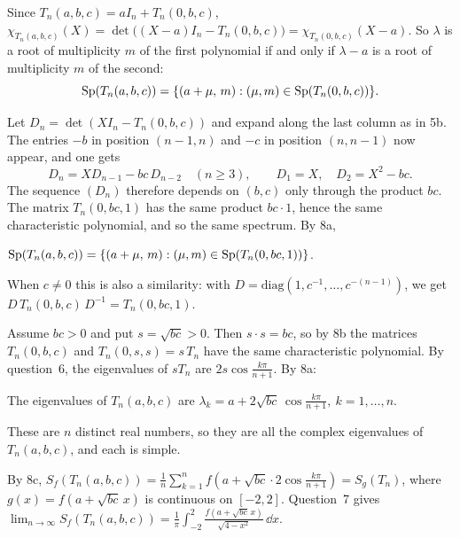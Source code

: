 \documentclass[11pt,a4paper]{article}
\begin{document}
Since $T_n(a,b,c) = aI_n + T_n(0,b,c)$,
$\chi_{T_n(a,b,c)}(X) = \det\bigl((X-a)I_n - T_n(0,b,c)\bigr) = \chi_{T_n(0,b,c)}(X-a)$.
So $\lambda$ is a root of multiplicity $m$ of the first polynomial if and only if $\lambda - a$
is a root of multiplicity $m$ of the second:
\[
  \operatorname{Sp}(T_n(a,b,c)) = \{(a+\mu,\,m) : (\mu,m)\in\operatorname{Sp}(T_n(0,b,c))\}.
\]

Let $D_n = \det(XI_n - T_n(0,b,c))$ and expand along the last column as in 5b. The
entries $-b$ in position $(n-1,n)$ and $-c$ in position $(n,n-1)$ now appear, and one gets
\[
  D_n = X D_{n-1} - bc\,D_{n-2}\quad(n\ge3), \qquad D_1 = X,\quad D_2 = X^2 - bc .
\]
The sequence $(D_n)$ therefore depends on $(b,c)$ only through the product $bc$. The matrix
$T_n(0,bc,1)$ has the same product $bc\cdot1$, hence the same characteristic polynomial, and
so the same spectrum. By 8a,
\begin{result}
$\operatorname{Sp}(T_n(a,b,c)) = \{(a+\mu,\,m) : (\mu,m)\in\operatorname{Sp}(T_n(0,bc,1))\}$.
\end{result}
\begin{remark}
When $c\ne0$ this is also a similarity: with $D = \mathrm{diag}(1, c^{-1},\dots,c^{-(n-1)})$,
we get $D\,T_n(0,b,c)\,D^{-1} = T_n(0,bc,1)$.
\end{remark}

Assume $bc > 0$ and put $s = \sqrt{bc} > 0$. Then $s\cdot s = bc$, so by 8b the matrices
$T_n(0,b,c)$ and $T_n(0,s,s) = s\,T_n$ have the same characteristic polynomial. By question~6,
the eigenvalues of $sT_n$ are $2s\cos\frac{k\pi}{n+1}$. By 8a:
\begin{result}
The eigenvalues of $T_n(a,b,c)$ are
$\displaystyle\lambda_k = a + 2\sqrt{bc}\,\cos\frac{k\pi}{n+1},\ k = 1,\dots,n$.
\end{result}
These are $n$ distinct real numbers, so they are all the complex eigenvalues of
$T_n(a,b,c)$, and each is simple.

By 8c, $S_f(T_n(a,b,c)) = \frac1n\sum_{k=1}^n f\!\left(a + \sqrt{bc}\cdot2\cos\frac{k\pi}{n+1}\right)
= S_g(T_n)$, where $g(x) = f(a + \sqrt{bc}\,x)$ is continuous on $[-2,2]$. Question~7 gives
$\displaystyle\lim_{n\to\infty}S_f(T_n(a,b,c)) = \frac1\pi\int_{-2}^2\frac{f(a+\sqrt{bc}\,x)}{\sqrt{4-x^2}}\,\dd x$.
\end{document}
